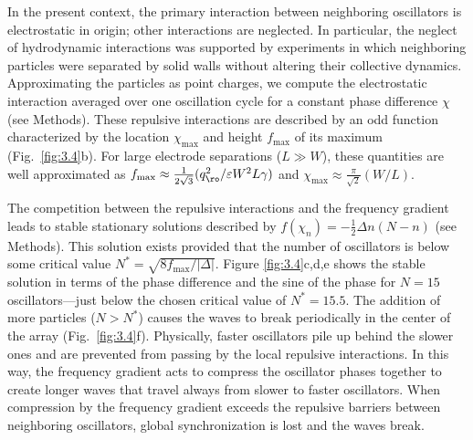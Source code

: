 In the present context, the primary interaction between neighboring oscillators is electrostatic in origin; other interactions are neglected. In particular, the neglect of hydrodynamic interactions was supported by experiments in which neighboring particles were separated by solid walls without altering their collective dynamics.  Approximating the particles as point charges, we compute the electrostatic interaction averaged over one oscillation cycle for a constant phase difference $\chi$ (see Methods). These repulsive interactions are described by an odd function characterized by the location $\chi_{\max}$ and height $f_{\max}$ of its maximum  (Fig.~\ref{fig:3.4}b).  For large electrode separations ($L\gg W$), these quantities are well approximated as $f_{\max}\approx \tfrac{1}{2\sqrt{3}} (q_{\ro}^2/\varepsilon W^2 L \gamma)$ and $\chi_{\max}\approx\tfrac{\pi}{\sqrt{2}} (W/L)$. 

The competition between the repulsive interactions and the frequency gradient leads to stable stationary solutions described by $f(\chi_n) = -\frac{1}{2}\Delta n(N-n)$ (see Methods). This solution exists provided that the number of oscillators is below some critical value $N^* = \sqrt{8 f_{\max}/\lvert\Delta\rvert}$. Figure \ref{fig:3.4}c,d,e shows the stable solution in terms of the phase difference and the sine of the phase for $N=15$ oscillators---just below the chosen critical value of $N^*=15.5$. The addition of more particles ($N>N^*$) causes the waves to break periodically in the center of the array (Fig.~\ref{fig:3.4}f). Physically, faster oscillators pile up behind the slower ones and are prevented from passing by the local repulsive interactions.  In this way, the frequency gradient acts to compress the oscillator phases together to create longer waves that travel always from slower to faster oscillators. When compression by the frequency gradient exceeds the repulsive barriers between neighboring oscillators, global synchronization is lost and the waves break. 

